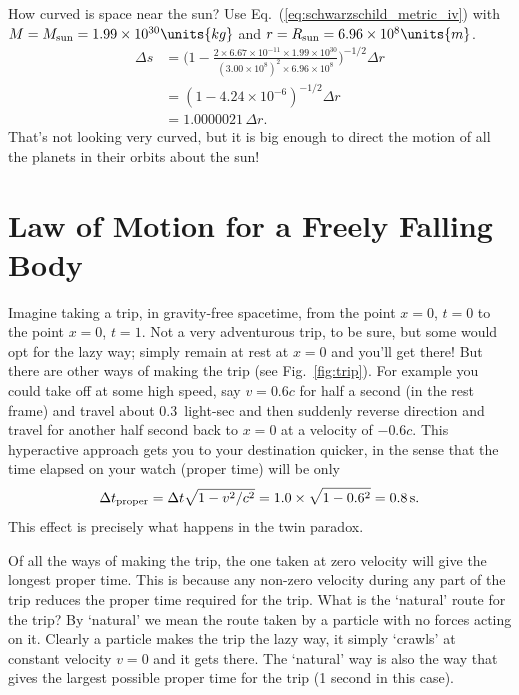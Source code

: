 \begin{example}{}
How curved is space near the sun?
\solution
Use Eq.~(\ref{eq:schwarzschild_metric_iv}) with $M=M_\text{sun}=
1.99\times 10^{30}\units{kg}$ and $r=R_\text{sun}=6.96\times
10^{8}\units{m}$.
\begin{align}
\Delta s &= \biggl(1-\frac{2\times 6.67\times 10^{-11}\times 1.99\times
  10^{30}}{(3.00\times 10^{8})^2\times 6.96\times
  10^8}\biggr)^{-1/2}\Delta r \nonumber\\
 &= (1-4.24\times 10^{-6})^{-1/2}\Delta r \nonumber\\
 &= 1.0000021\,\Delta r.
\end{align}
That's not looking very curved, but it is big enough to direct the
motion of all the planets in their orbits about the sun!
\end{example}


\section{Law of Motion for a Freely Falling Body}
     
Imagine taking a trip, in gravity-free spacetime, from the point $x =
0$, $t = 0$ to the point $x = 0$, $t = 1$.  Not a very adventurous
trip, to be sure, but some would opt for the lazy way; simply remain
at rest at $x = 0$ and you'll get there!  But there are other ways of
making the trip (see Fig.~\ref{fig:trip}).  For example you could take
off at some high speed, say $v = 0.6 c$ for half a second (in the rest
frame) and travel about 0.3\, light-sec and then suddenly reverse
direction and travel for another half second back to $x = 0$ at a
velocity of $-0.6 c$.  This hyperactive approach gets you to your
destination quicker, in the sense that the time elapsed on your watch
(proper time) will be only
\begin{equation}
\Delta t_{\rm proper} = \Delta t \sqrt{1 - v^2/c^2} = 
      1.0 \times \sqrt{1 - 0.6^2} = 0.8\, \mbox{s}. 
\label{eq:deltatnograv}
\end{equation}     
This effect is precisely what happens in the twin paradox.
     
Of all the ways of making the trip, the one taken at zero velocity
will give the longest proper time.  This is because any non-zero
velocity during any part of the trip reduces the proper time required
for the trip.  What is the `natural' route for the trip?  By
`natural' we mean the route taken by a particle with no forces
acting on it.  Clearly a particle makes the trip the lazy way, it
simply `crawls' at constant velocity $v = 0$ and it gets there.
The `natural' way is also the way that gives the largest
possible proper time for the trip (1 second in this case).
        
